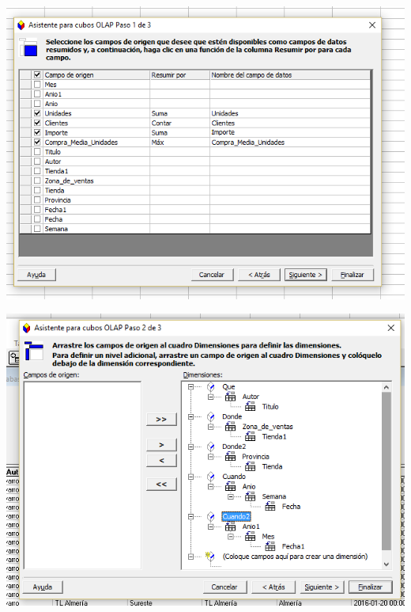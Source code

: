 \documentclass[paper=a4, fontsize=11pt, spanish]{scrartcl}
\numberwithin{equation}{section} %
\numberwithin{figure}{section} %
\numberwithin{table}{section} %
\begin{document}
\begin{center}
	\includegraphics[scale=0.75]{img7.png}
	
	\medskip 	
	
	\includegraphics[scale=0.75]{img8.png}
\end{center}
\end{document}
